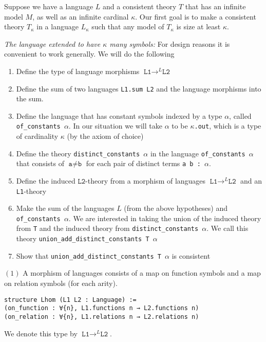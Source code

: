 \documentclass{article}
\newcommand{\al}{\alpha}
\newcommand{\ka}{\kappa}
\newcommand{\<}{\langle}
\renewcommand{\>}{\rangle}
\theoremstyle{definitionstyle}
\theoremstyle{exercisestyle}
\theoremstyle{remarkstyle}
\begin{document}
Suppose we have a language $L$ and a consistent theory $T$ that has
an infinite model $M$, as well as an infinite cardinal $\kappa$.
Our first goal is to make a consistent theory $T_\kappa$
in a language $L_{\kappa}$ such that any model of $T_{\kappa}$
is size at least $\kappa$.

\textit{The language extended to have $\kappa$ many symbols:}
For design reasons it is convenient to work generally.
We will do the following
\begin{enumerate}
  \item Define the type of language morphisms $\texttt{L1} \to^{L} \texttt{L2}$
  \item Define the sum of two languages \texttt{L1.sum L2}
        and the language morphisms into the sum.
  \item Define the language that has constant symbols indexed by a type $\al$,
        called \texttt{of\_constants $\al$}.
        In our situation we will take $\al$ to be \texttt{$\ka$.out},
        which is a type of cardinality $\kappa$ (by the axiom of choice)
  \item Define the theory \texttt{distinct\_constants $\al$}
        in the language \texttt{of\_constants $\al$}
        that consists of $\texttt{a} \ne \texttt{b}$
        for each pair of distinct terms \texttt{a b : $\al$}.
  \item Define the induced $\texttt{L2}$-theory
        from a morphism of languages $\texttt{L1} \to^{L} \texttt{L2}$ and
        an \texttt{L1}-theory
  \item Make the sum of the languages $L$ (from the above hypotheses)
        and \texttt{of\_constants $\al$}.
        We are interested in taking the union of the induced theory from \texttt{T}
        and the induced theory from
        \texttt{distinct\_constants $\al$}.
        We call this theory \texttt{union\_add\_distinct\_constants T $\al$}
  \item Show that \texttt{union\_add\_distinct\_constants T $\al$} is consistent
\end{enumerate}

$(1)$ A morphism of languages consists of a map on function symbols
and a map on relation symbols (for each arity).
\begin{lstlisting}
structure Lhom (L1 L2 : Language) :=
(on_function : ∀{n}, L1.functions n → L2.functions n)
(on_relation : ∀{n}, L1.relations n → L2.relations n) \end{lstlisting}
We denote this type by $\texttt{L1} \to^{L} \texttt{L2}$.
\end{document}
